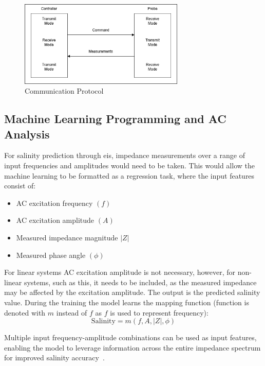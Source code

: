 \begin{figure}[H]
    \centering
    \includegraphics[width=0.7\textwidth]{figures/comms.png}
    \caption{Communication Protocol}
    \label{fig:comms}
\end{figure}

\subsection{Machine Learning Programming and AC Analysis}\label{sec:ml_for_eis}

For salinity prediction through \gls{eis}, impedance measurements over a range of input frequencies and amplitudes would need to be taken.
This would allow the machine learning to be formatted as a regression task, where the input features consist of:
\begin{itemize}
    \item AC excitation frequency $(f)$
    \item AC excitation amplitude $(A)$
    \item Measured impedance magnitude $|Z|$
    \item Measured phase angle $(\phi)$
\end{itemize}

For linear systems AC excitation amplitude is not necessary, however, for non-linear systems, such as this, it needs to be included, as the measured impedance may be affected by the excitation amplitude.
The output is the predicted salinity value. During the training the model learns the mapping function (function is denoted with $m$ instead of $f$ as $f$ is used to represent frequency):
\begin{equation}
    \text{Salinity}= m(f,A,|Z|,\phi)
\end{equation}

Multiple input frequency-amplitude combinations can be used as input features, enabling the model to leverage information across the entire impedance spectrum for improved salinity accuracy~\cite{wang_deep_2024}.

